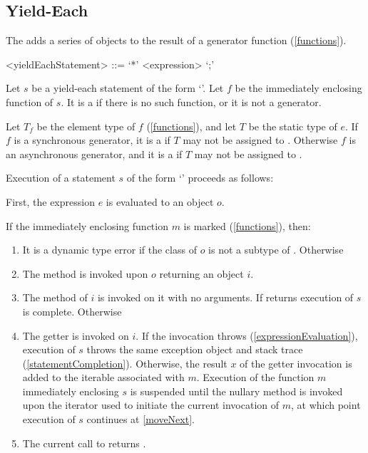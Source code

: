 \documentclass[makeidx]{article}
\begin{document}
\subsection{Yield-Each}

\LMHash{}%
The  adds a series of objects to
the result of a generator function
(\ref{functions}).

\begin{grammar}
<yieldEachStatement> ::= \YIELD{} `*' <expression> `;'
\end{grammar}

\LMHash{}%
Let $s$ be a yield-each statement of the form `'.
Let $f$ be the immediately enclosing function of $s$.
It is a  if there is no such function,
or it is not a generator.

\LMHash{}%
Let $T_f$ be the element type of $f$
(\ref{functions}),
and let $T$ be the static type of $e$.
If $f$ is a synchronous generator,
it is a  if $T$ may not be assigned to
.
Otherwise $f$ is an asynchronous generator,
and it is a  if $T$ may not be assigned to
.

\LMHash{}%
Execution of a statement $s$ of the form `'
proceeds as follows:

\LMHash{}%
First, the expression $e$ is evaluated to an object $o$.

\LMHash{}%
If the immediately enclosing function $m$ is marked \code{\SYNC*}
(\ref{functions}),
then:
\begin{enumerate}
\item
  It is a dynamic type error
  if the class of $o$ is not a subtype of .
  Otherwise
\item
  The method  is invoked upon $o$ returning an object $i$.
\item
  \label{moveNext} The  method of $i$ is invoked on it
  with no arguments.
  If  returns \FALSE{} execution of $s$ is complete.
  Otherwise
\item
  The getter  is invoked on $i$.
  If the invocation throws
  (\ref{expressionEvaluation}),
  execution of $s$ throws the same exception object and stack trace
  (\ref{statementCompletion}).
  Otherwise, the result $x$ of the getter invocation is added to
  the iterable associated with $m$.
  Execution of the function $m$ immediately enclosing $s$ is suspended
  until the nullary method  is invoked
  upon the iterator used to initiate the current invocation of $m$,
  at which point execution of $s$ continues at \ref{moveNext}.
\item
The current call to  returns \TRUE.
\end{enumerate}
\end{document}
